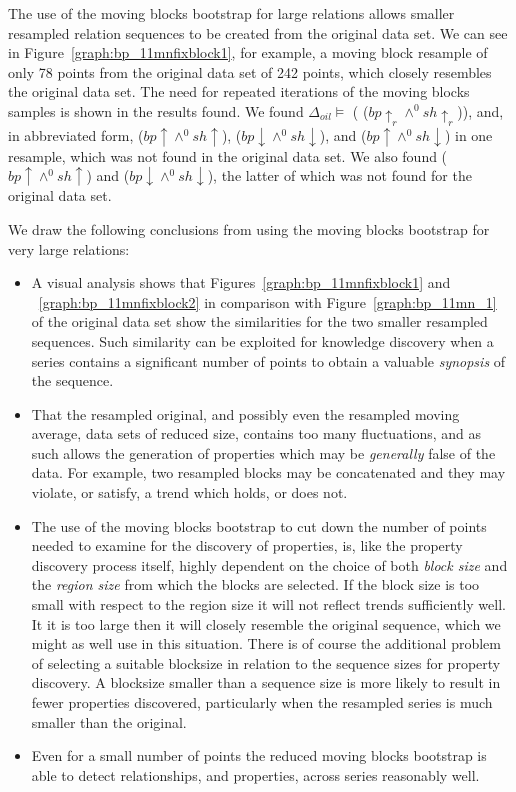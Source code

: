 The use of the moving blocks bootstrap for large relations allows
smaller resampled relation sequences to be created from the original data set. 
We can see in Figure~\ref{graph:bp_11mnfixblock1}, for example,
a moving block resample of only 78 points from the original data set
of 242 points, which closely resembles the original data set. The need
for repeated iterations of the moving blocks samples is shown in the
results found. We found $\Delta_{oil} \models$ (
($bp \uparrow_r \wedge^0  sh \uparrow_r$)), and, in abbreviated form,  ($bp \uparrow \wedge^0
sh \uparrow$),  ($bp \downarrow \wedge^0
sh \downarrow$), and  ($bp \uparrow \wedge^0
sh \downarrow$) in one resample, which was not found in the original data
set. We also found  ($bp \uparrow \wedge^0
sh \uparrow$) and  ($bp \downarrow \wedge^0
sh \downarrow$), the latter of which was not found for the original
data set.

\medskip

We draw the following conclusions from using the moving blocks
bootstrap for very large relations:
\begin{itemize}
\item A visual analysis shows that Figures~\ref{graph:bp_11mnfixblock1} and
~\ref{graph:bp_11mnfixblock2} in comparison with
Figure~\ref{graph:bp_11mn_1} of the original data set show the
similarities for the two smaller resampled sequences. Such similarity can be 
exploited for knowledge discovery when a series contains a significant
number of points to obtain a valuable {\em synopsis} of the sequence.
\item That the resampled original, and possibly even the resampled
moving average, data sets of reduced size, contains too many fluctuations, and as such allows the
generation of properties which may be {\em generally} false of the
data. For example, two resampled blocks may be concatenated and they
may violate, or satisfy, a trend which holds, or does not.
\item The use of the moving blocks bootstrap to cut down the number of
points needed to examine for the discovery of properties, is, like the
property discovery process itself, highly dependent on the choice of
both {\em block size} and the {\em region size} from which the blocks
are selected. If the block size is too small with respect to the
region size it will not reflect trends sufficiently well. It it is too
large then it will closely resemble the original sequence, which we
might as well use in this situation. There is of course the additional
problem of selecting a suitable blocksize in relation to the sequence
sizes for property discovery. A blocksize smaller than a sequence size
is more likely to result in fewer properties discovered, particularly
when the resampled series is much smaller than the original.
\item Even for a small number of points the reduced moving blocks
bootstrap is able to detect relationships, and properties, across
series reasonably well.
\end{itemize}

